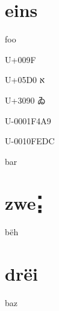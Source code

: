 \documentclass{article}%
\begin{document}
\section{eins}

foo

U+009F 

U+05D0 א

U+3090 ゐ

U-0001F4A9 💩

U-0010FEDC 􏻜

bar

\section{zwe⡅}

bëh

\section{drëi}

baz
\end{document}
